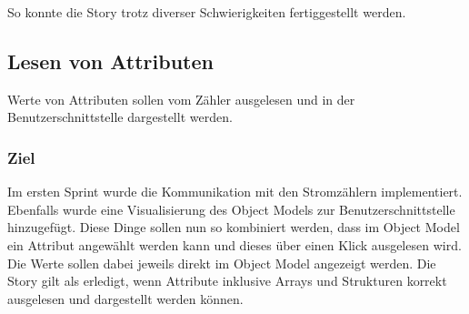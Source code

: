 So konnte die Story trotz diverser Schwierigkeiten fertiggestellt werden.

\subsection{Lesen von Attributen}
\dq Werte von Attributen sollen vom Zähler ausgelesen und in der Benutzerschnittstelle dargestellt werden.\dq
\subsubsection{Ziel}
Im ersten Sprint wurde die Kommunikation mit den Stromzählern implementiert.
Ebenfalls wurde eine Visualisierung des Object Models zur Benutzerschnittstelle hinzugefügt.
Diese Dinge sollen nun so kombiniert werden, dass im Object Model ein Attribut angewählt werden kann und dieses über einen Klick ausgelesen wird.
Die Werte sollen dabei jeweils direkt im Object Model angezeigt werden.
Die Story gilt als erledigt, wenn Attribute inklusive Arrays und Strukturen korrekt ausgelesen und dargestellt werden können.

